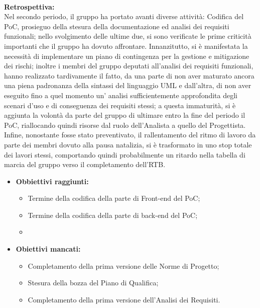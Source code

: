 \paragraph{}
\textbf{Retrospettiva:} \\
Nel secondo periodo, il gruppo ha portato avanti diverse attività: Codifica del PoC, prosieguo della stesura della documentazione ed analisi dei requisiti funzionali; nello svolgimento delle ultime due, si sono verificate
le prime criticità importanti che il gruppo ha dovuto affrontare. Innanzitutto, si è manifestata la necessità di implementare un piano di contingenza per la gestione e mitigazione dei rischi; inoltre i membri del gruppo deputati
all'analisi dei requisiti funzionali, hanno realizzato tardivamente il fatto, da una parte di non aver maturato ancora una piena padronanza della sintassi del linguaggio UML e dall'altra, di non aver eseguito fino a quel
momento un' analisi sufficientemente approfondita degli scenari d'uso e di conseguenza dei requisiti stessi; a questa immaturità, si è aggiunta la volontà da parte del gruppo di ultimare
entro la fine del periodo il PoC, riallocando quindi risorse dal ruolo dell'Analista a quello del Progettista. Infine, nonostante fosse stato preventivato, il rallentamento del ritmo di lavoro da parte dei membri
dovuto alla pausa natalizia, si è trasformato in uno stop totale dei lavori stessi, comportando quindi probabilmente un ritardo nella tabella di marcia del gruppo verso il completamento dell'RTB.
\begin{itemize}
\item \textbf{Obbiettivi raggiunti:}
    \begin{itemize}
        \item Termine della codifica della parte di Front-end del PoC;
        \item Termine della codifica della parte di back-end del PoC;
        \item
    \end{itemize}
    \item \textbf{Obiettivi mancati:}
    \begin{itemize}
        \item Completamento della prima versione delle Norme di Progetto;
        \item Stesura della bozza del Piano di Qualifica;
        \item Completamento della prima versione dell'Analisi dei Requisiti.
    \end{itemize}
\end{itemize}

